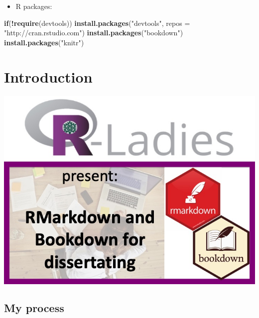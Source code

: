 \documentclass[
  12pt,
  oneside]{book}
\newenvironment{Shaded}{\begin{snugshade}}{\end{snugshade}}
\newcommand{\ControlFlowTok}[1]{\textcolor[rgb]{0.13,0.29,0.53}{\textbf{#1}}}
\newcommand{\DataTypeTok}[1]{\textcolor[rgb]{0.13,0.29,0.53}{#1}}
\newcommand{\KeywordTok}[1]{\textcolor[rgb]{0.13,0.29,0.53}{\textbf{#1}}}
\newcommand{\NormalTok}[1]{#1}
\newcommand{\OperatorTok}[1]{\textcolor[rgb]{0.81,0.36,0.00}{\textbf{#1}}}
\newcommand{\StringTok}[1]{\textcolor[rgb]{0.31,0.60,0.02}{#1}}
\providecommand{\tightlist}{%
  \setlength{\itemsep}{0pt}\setlength{\parskip}{0pt}}
\numberwithin{figure}{chapter}
\begin{document}
\begin{itemize}
\tightlist
\item
  R packages:
\end{itemize}

\begin{Shaded}
\begin{Highlighting}[]
\ControlFlowTok{if}\NormalTok{(}\OperatorTok{!}\KeywordTok{require}\NormalTok{(devtools))}
  \KeywordTok{install.packages}\NormalTok{(}\StringTok{"devtools"}\NormalTok{, }\DataTypeTok{repos =} \StringTok{"http://cran.rstudio.com"}\NormalTok{)}
\KeywordTok{install.packages}\NormalTok{(}\StringTok{"bookdown"}\NormalTok{)}
\KeywordTok{install.packages}\NormalTok{(}\StringTok{"knitr"}\NormalTok{)}
\end{Highlighting}
\end{Shaded}

\hypertarget{intro}{%
\chapter{Introduction}\label{intro}}

\includegraphics{../images/rladies-dissertating.jpeg}

\hypertarget{process}{%
\section{My process}\label{process}}
\end{document}
